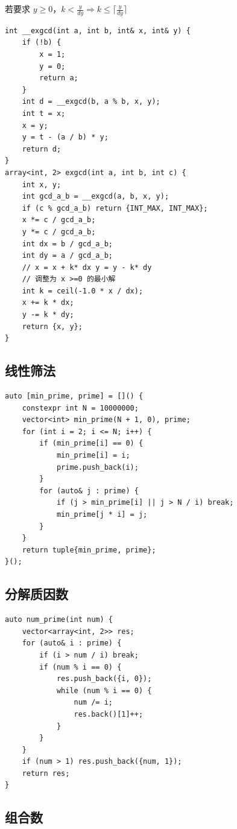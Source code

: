 \documentclass[UTF8]{ctexart}
\begin{document}
\begin{sloppypar}
若要求 $y\ge0$，$k<\frac{y}{dy}\Rightarrow k\le\lceil \frac{y}{dy}\rceil$


\begin{lstlisting}[style=cpp]
int __exgcd(int a, int b, int& x, int& y) {
    if (!b) {
        x = 1;
        y = 0;
        return a;
    }
    int d = __exgcd(b, a % b, x, y);
    int t = x;
    x = y;
    y = t - (a / b) * y;
    return d;
}
array<int, 2> exgcd(int a, int b, int c) {
    int x, y;
    int gcd_a_b = __exgcd(a, b, x, y);
    if (c % gcd_a_b) return {INT_MAX, INT_MAX};
    x *= c / gcd_a_b;
    y *= c / gcd_a_b;
    int dx = b / gcd_a_b;
    int dy = a / gcd_a_b;
    // x = x + k* dx y = y - k* dy
    // 调整为 x >=0 的最小解
    int k = ceil(-1.0 * x / dx);
    x += k * dx;
    y -= k * dy;
    return {x, y};
}
\end{lstlisting}

\subsection{线性筛法}

\begin{lstlisting}[style=cpp]
auto [min_prime, prime] = []() {
    constexpr int N = 10000000;
    vector<int> min_prime(N + 1, 0), prime;
    for (int i = 2; i <= N; i++) {
        if (min_prime[i] == 0) {
            min_prime[i] = i;
            prime.push_back(i);
        }
        for (auto& j : prime) {
            if (j > min_prime[i] || j > N / i) break;
            min_prime[j * i] = j;
        }
    }
    return tuple{min_prime, prime};
}();
\end{lstlisting}

\subsection{分解质因数}

\begin{lstlisting}[style=cpp]
auto num_prime(int num) {
    vector<array<int, 2>> res;
    for (auto& i : prime) {
        if (i > num / i) break;
        if (num % i == 0) {
            res.push_back({i, 0});
            while (num % i == 0) {
                num /= i;
                res.back()[1]++;
            }
        }
    }
    if (num > 1) res.push_back({num, 1});
    return res;
}
\end{lstlisting}

\subsection{组合数}


\end{sloppypar}
\end{document}
